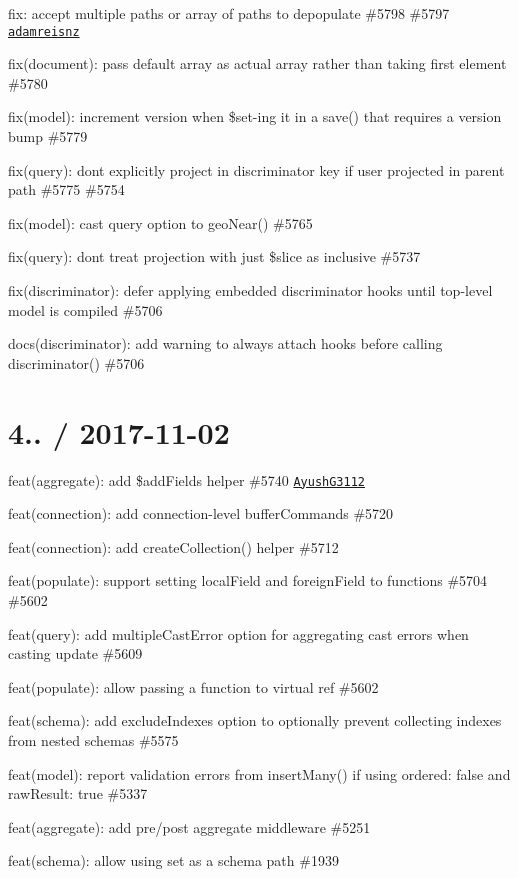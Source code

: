 \begin{DoxyItemize}
\item fix\+: accept multiple paths or array of paths to depopulate \#5798 \#5797 \href{https://github.com/adamreisnz}{\tt adamreisnz}
\item fix(document)\+: pass default array as actual array rather than taking first element \#5780
\item fix(model)\+: increment version when \$set-\/ing it in a save() that requires a version bump \#5779
\item fix(query)\+: don\textquotesingle{}t explicitly project in discriminator key if user projected in parent path \#5775 \#5754
\item fix(model)\+: cast query option to geo\+Near() \#5765
\item fix(query)\+: don\textquotesingle{}t treat projection with just \$slice as inclusive \#5737
\item fix(discriminator)\+: defer applying embedded discriminator hooks until top-\/level model is compiled \#5706
\item docs(discriminator)\+: add warning to always attach hooks before calling discriminator() \#5706
\end{DoxyItemize}

\section*{4.. / 2017-\/11-\/02 }


\begin{DoxyItemize}
\item feat(aggregate)\+: add \$add\+Fields helper \#5740 \href{https://github.com/AyushG3112}{\tt Ayush\+G3112}
\item feat(connection)\+: add connection-\/level buffer\+Commands \#5720
\item feat(connection)\+: add create\+Collection() helper \#5712
\item feat(populate)\+: support setting local\+Field and foreign\+Field to functions \#5704 \#5602
\item feat(query)\+: add multiple\+Cast\+Error option for aggregating cast errors when casting update \#5609
\item feat(populate)\+: allow passing a function to virtual ref \#5602
\item feat(schema)\+: add exclude\+Indexes option to optionally prevent collecting indexes from nested schemas \#5575
\item feat(model)\+: report validation errors from {\ttfamily insert\+Many()} if using {\ttfamily ordered\+: false} and {\ttfamily raw\+Result\+: true} \#5337
\item feat(aggregate)\+: add pre/post aggregate middleware \#5251
\item feat(schema)\+: allow using {\ttfamily set} as a schema path \#1939
\end{DoxyItemize}

